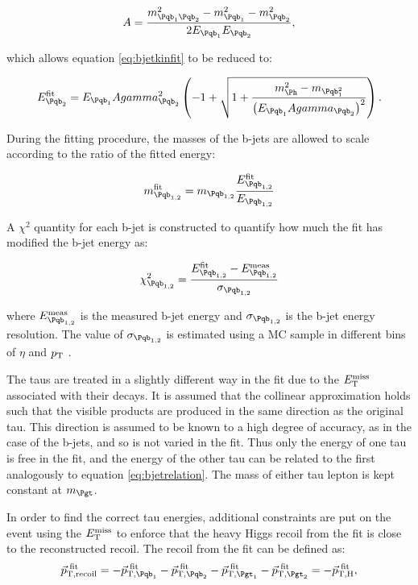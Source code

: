 \begin{equation}
A = \frac{m_{\Pqb_{1}\Pqb_{2}}^{2} - m_{\Pqb_{1}}^{2} - m_{\Pqb_{2}}^{2}}{2E_{\Pqb_{1}}E_{\Pqb_{2}}} , 
\end{equation}

which allows equation \ref{eq:bjetkinfit} to be reduced to:

\begin{equation}
E_{\Pqb_{2}}^{\text{fit}} = E_{\Pqb_{1}}A\gamma_{\Pqb_{2}}^{2}\left(-1 + \sqrt{1 +
\frac{m_{\Ph}^{2} -
m_{\Pqb_{1}^{2}}}{\left(E_{\Pqb_{1}}A\gamma_{\Pqb_{2}}\right)^{2}}}\right) .
\label{eq:bjetrelation}
\end{equation}

During the fitting procedure, the masses of the b-jets are allowed to scale
according to the ratio of the fitted energy:

\begin{equation}
m_{\Pqb_{1,2}}^{\text{fit}} = m_{\Pqb_{1,2}} \frac{E_{\Pqb_{1,2}}^{\text{fit}}}{E_{\Pqb_{1,2}}} 
\end{equation}

A $\chi^{2}$ quantity for each b-jet is constructed to quantify how much the fit has
modified the b-jet energy as:

\begin{equation}
\chi_{\Pqb_{1,2}}^{2} = \frac{E_{\Pqb_{1,2}}^{\text{fit}} -
E_{\Pqb_{1,2}}^{\text{meas}}}{\sigma_{\Pqb_{1,2}}}
\end{equation}

where $E_{\Pqb_{1,2}}^{\text{meas}}$ is the measured b-jet energy and $\sigma_{\Pqb_{1,2}}$
is the b-jet energy resolution. The value of $\sigma_{\Pqb_{1,2}}$ is estimated
using a \ac{MC} sample in different bins of $\eta$ and $p_{\mathrm{T}}$ \cite{Schlieckau}. 

The taus are treated in a slightly different way in the fit due to the $E_{\mathrm{T}}^{\text{miss}}$
associated with their decays. It is assumed that the collinear approximation
holds such that the visible products are produced in the same direction as the
original tau. This direction is assumed to be known to a high degree of
accuracy, as in the case of the b-jets, and so is not varied in the fit. Thus 
only the energy of one tau is free in the fit, and
the energy of the other tau can be related to the first analogously to 
equation \ref{eq:bjetrelation}. The mass of either tau lepton is kept
constant at $m_{\Pgt}$.  

In order to find the correct tau energies, additional constraints are put on
the event using the $E_{\mathrm{T}}^{\text{miss}}$ to enforce that the heavy Higgs recoil from the fit
is close to the reconstructed recoil. The recoil from the fit can be defined as:
\begin{equation}
\vec{p}_{\text{T},\text{recoil}}^{\text{~fit}} = -
\vec{p}_{\text{T},\Pqb_{1}}^{\text{~fit}} -
\vec{p}_{\text{T},\Pqb_{2}}^{\text{~fit}} -
\vec{p}_{\text{T},\Pgt_{1}}^{\text{~fit}} - \vec{p}_{\text{T},\Pgt_{2}}^{\text{~fit}} = -
\vec{p}_{\text{T},\text{H}}^{\text{~fit}} ,
\end{equation}

